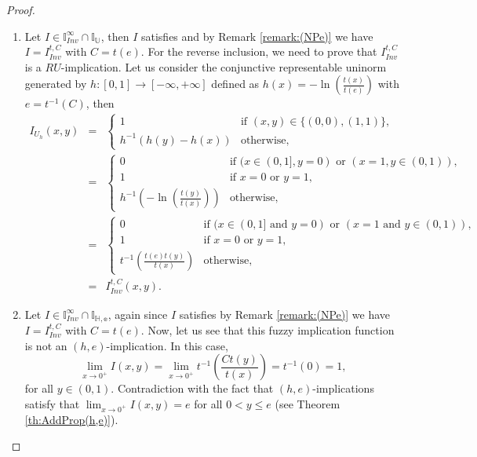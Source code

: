 \begin{proof}
\begin{enumerate}[label=(\roman*)]
\begin{itemize}
		\end{itemize}
		\item  Let $I \in \mathbb{I}^{\infty}_{Inv} \cap \mathbb{I}_{\mathbb{U}}$, then $I$ satisfies \NPe and by Remark \ref{remark:(NPe)} we have $I=I_{Inv}^{t,C}$ with $C=t(e)$. For the reverse inclusion, we need to prove that $I_{Inv}^{t,C}$ is a $RU$-implication. Let us consider the conjunctive representable uninorm generated by $h:[0,1] \to [-\infty,+\infty]$ defined as $h(x)=-\ln\left(\frac{t(x)}{t(e)}\right)$ with $e=t^{-1}(C)$, then
		\begin{eqnarray*}
			I_{U_h}(x,y)
			&=&
			\left\{ \begin{array}{ll}
				1 &  \text{if }  (x,y) \in \{(0,0),(1,1)\}, \\
				h^{-1}(h(y)-h(x)) &  \text{otherwise,}
			\end{array}
			\right. \\
			&=&
			\left\{ \begin{array}{ll}
				0 &  \text{if } (x \in (0,1], y=0) \text{ or } (x=1, y \in (0,1)), \\
				1 & \text{if } x=0 \text{ or } y=1, \\
				h^{-1} \left(-\ln \left(\frac{t(y)}{t(x)}\right)\right) &  \text{otherwise,}
			\end{array}
			\right.\\
			&=&
			\left\{ \begin{array}{ll}
				0 &  \text{if } (x \in (0,1] \text{ and } y=0) \text{ or } (x=1 \text{ and } y \in (0,1)), \\
				1 & \text{if } x=0 \text{ or } y=1, \\
				t^{-1}\left(\frac{t(e)t(y)}{t(x)}\right) &  \text{otherwise,}
			\end{array}
			\right. \\
			&=&I_{Inv}^{t,C}(x,y).
		\end{eqnarray*}
		\item Let $I \in \mathbb{I}^{\infty}_{Inv} \cap \mathbb{I}_{\mathbb{H},\mathbb{e}}$, again since $I$ satisfies \NPe by Remark \ref{remark:(NPe)} we have $I=I_{Inv}^{t,C}$ with $C=t(e)$. Now, let us see that this fuzzy implication function is not an $(h,e)$-implication. In this case,
		$$ \lim_{x \to 0^+} I(x,y)=\lim_{x\to 0^+} t^{-1} \left(\frac{Ct(y)}{t(x)}\right) = t^{-1}(0)=1,$$
		for all $y \in (0,1)$. Contradiction with the fact that $(h,e)$-implications satisfy that  $ \displaystyle \lim_{x \to 0^+} I(x,y)=e$ for all $0<y \leq e$ (see Theorem \ref{th:AddProp(h,e)}).
	\end{enumerate}
\end{proof}
